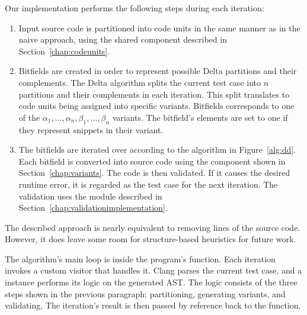 Our implementation performs the following steps during each iteration:
\begin{enumerate}
  \item Input source code is partitioned into code units in the same manner 
  as in the naive approach, using the shared component described in 
  Section~\ref{chap:codeunits}.
  \item Bitfields are created in order to represent possible Delta 
  partitions and their complements. 
  The Delta algorithm splits the current test case into $n$ partitions and 
  their complements in each iteration. 
  This split translates to code units being assigned into specific variants. 
  Bitfields corresponds to one of 
  the $\alpha_1,\dots,\alpha_n,\beta_1,\dots,\beta_n$ variants. 
  The bitfield's elements are set to one if they represent snippets in their 
  variant.
  \item The bitfields are iterated over according to the algorithm in 
  Figure~\ref{alg:dd}. 
  Each bitfield is converted into source code using the component shown in 
  Section~\ref{chap:variants}. 
  The code is then validated. 
  If it causes the desired runtime error, it is regarded as the test case 
  for the next iteration. 
  The validation uses the module described in 
  Section~\ref{chap:validationimplementation}.
\end{enumerate}
The described approach is nearly equivalent to removing lines of the source 
code. 
However, it does leave some room for structure-based heuristics for future 
work.

The algorithm's main loop is inside the program's  function. 
Each iteration invokes a custom visitor that handles it. 
Clang parses the current test case, and a  
instance performs its logic on the generated AST. 
The logic consists of the three steps shown in the previous paragraph: 
partitioning, generating variants, and validating. 
The iteration's result is then passed by reference back to the  
function. 

